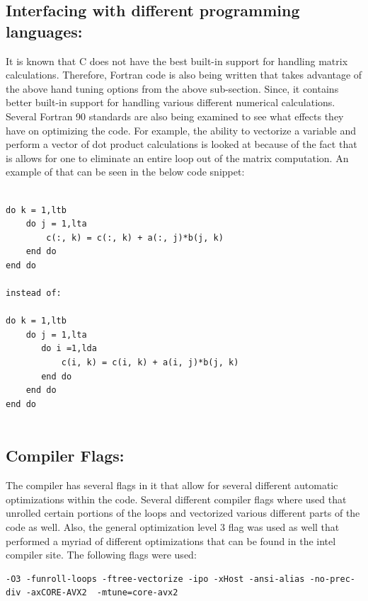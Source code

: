 \documentclass{article}
\begin{document}
\subsection*{Interfacing with different programming languages:}

It is known that C does not have the best built-in support for handling matrix calculations. Therefore, Fortran code is also being written that takes advantage of the above hand tuning options from the above sub-section. Since, it contains better built-in support for handling various different numerical calculations. Several Fortran 90 standards are also being examined to see what effects they have on optimizing the code. For example, the ability to vectorize a variable and perform a vector of dot product calculations is looked at because of the fact that is allows for one to eliminate an entire loop out of the matrix computation. An example of that can be seen in the below code snippet:
\begin{verbatim}

do k = 1,ltb
    do j = 1,lta
        c(:, k) = c(:, k) + a(:, j)*b(j, k)
    end do
end do

instead of:

do k = 1,ltb
    do j = 1,lta
       do i =1,lda
           c(i, k) = c(i, k) + a(i, j)*b(j, k)
       end do
    end do
end do


\end{verbatim}

\subsection*{Compiler Flags:}

The compiler has several flags in it that allow for several different automatic optimizations within the code. Several different compiler flags where used that unrolled certain portions of the loops and vectorized various different parts of the code as well.  Also, the general optimization level 3 flag was used as well that performed a myriad of different optimizations that can be found in the intel compiler site. The following flags were used:

\begin{verbatim}
-O3 -funroll-loops -ftree-vectorize -ipo -xHost -ansi-alias -no-prec-div -axCORE-AVX2  -mtune=core-avx2
\end{verbatim}
\end{document}

